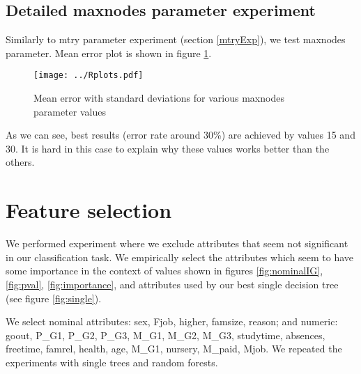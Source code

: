 \documentclass[a4paper]{article}
\begin{document}
\subsection{Detailed maxnodes parameter experiment}

Similarly to mtry parameter experiment (section \ref{mtryExp}), we test maxnodes parameter.
Mean error plot is shown in figure \ref{fig:detailedMaxnodes}.

\begin{figure}[!hbt]
    \centering
    \texttt{[image: ../Rplots.pdf]}
    \caption[]{Mean error with standard deviations for various maxnodes parameter values
    \label{fig:detailedMaxnodes}
    }
\end{figure}

As we can see, best results (error rate around 30\%) are achieved by values 15 and 30.
It is hard in this case to explain why these values works better than the others.


% 
% 

\section{Feature selection}
\label{featSel}
We performed experiment where we exclude attributes that
seem not significant in our classification task.
We empirically select the attributes which seem to have some importance in the context of
values shown in figures \ref{fig:nominalIG}, \ref{fig:pval}, \ref{fig:importance},
and attributes used by our best single decision tree (see figure \ref{fig:single}).

We select nominal attributes:
sex,
Fjob,
higher,
famsize,
reason; and numeric:
goout,
P\_G1,
P\_G2,
P\_G3,
M\_G1,
M\_G2,
M\_G3,
studytime,
absences,
freetime,
famrel,
health,
age,
M\_G1,
nursery,
M\_paid,
Mjob.
We repeated the experiments with single trees and random forests.
\end{document}

